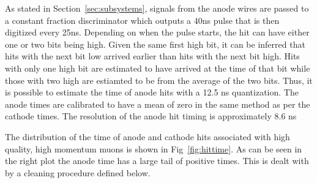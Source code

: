 As stated in Section~\ref{sec:subsystems}, signals from the anode wires are passed to a constant fraction discriminator which outputs a 40ns pulse
that is then digitized every 25ns. Depending on when the pulse starts, the hit can have either one or two bits being high. Given the same
first high bit, it can be inferred that hits with the next bit low arrived earlier than hits with the next bit high.
Hits with only one high bit are estimated to have arrived at the time of that bit while those with two high are estiamted to be from the average of the two bits.
Thus, it is possible to estimate the time of anode hits with a 12.5 ns quantization. The anode times are calibrated to have a mean of zero in the same method as
per the cathode times. The resolution of the anode hit timing is approximately 8.6 ns 

The distribution of the time of anode and cathode hits associated with high quality, high momentum muons is shown in Fig~\ref{fig:hittime}.
As can be seen in the right plot the anode time has a large tail of positive times. This is dealt with by a cleaning procedure defined below.

